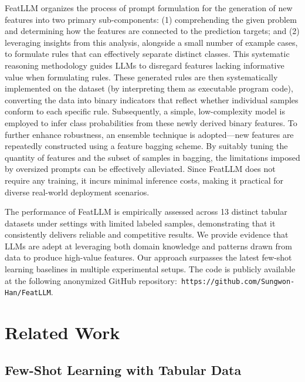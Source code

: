 \textsf{FeatLLM} organizes the process of prompt formulation for the generation of new features into two primary sub-components: (1) comprehending the given problem and determining how the features are connected to the prediction targets; and (2) leveraging insights from this analysis, alongside a small number of example cases, to formulate rules that can effectively separate distinct classes. This systematic reasoning methodology guides LLMs to disregard features lacking informative value when formulating rules. These generated rules are then systematically implemented on the dataset (by interpreting them as executable program code), converting the data into binary indicators that reflect whether individual samples conform to each specific rule. Subsequently, a simple, low-complexity model is employed to infer class probabilities from these newly derived binary features. To further enhance robustness, an ensemble technique is adopted—new features are repeatedly constructed using a feature bagging scheme. By suitably tuning the quantity of features and the subset of samples in bagging, the limitations imposed by oversized prompts can be effectively alleviated. Since \textsf{FeatLLM} does not require any training, it incurs minimal inference costs, making it practical for diverse real-world deployment scenarios.

The performance of \textsf{FeatLLM} is empirically assessed across 13 distinct tabular datasets under settings with limited labeled samples, demonstrating that it consistently delivers reliable and competitive results. We provide evidence that LLMs are adept at leveraging both domain knowledge and patterns drawn from data to produce high-value features. Our approach surpasses the latest few-shot learning baselines in multiple experimental setups. The code is publicly available at the following anonymized GitHub repository:~\texttt{https://github.com/Sungwon-Han/FeatLLM}.

\section{Related Work}

\subsection{Few-Shot Learning with Tabular Data} 

